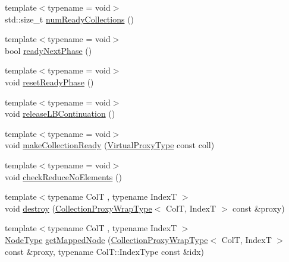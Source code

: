\begin{DoxyCompactItemize}
\item 
{\footnotesize template$<$typename  = void$>$ }\\std\+::size\+\_\+t \hyperlink{structvt_1_1vrt_1_1collection_1_1_collection_manager_a3fdd38adcd76281ada50f867e82817c6}{num\+Ready\+Collections} ()
\item 
{\footnotesize template$<$typename  = void$>$ }\\bool \hyperlink{structvt_1_1vrt_1_1collection_1_1_collection_manager_ae47451b1fb1fd640929995d964e052a6}{ready\+Next\+Phase} ()
\item 
{\footnotesize template$<$typename  = void$>$ }\\void \hyperlink{structvt_1_1vrt_1_1collection_1_1_collection_manager_af93d07828954a649201ef3fe463bf530}{reset\+Ready\+Phase} ()
\item 
{\footnotesize template$<$typename  = void$>$ }\\void \hyperlink{structvt_1_1vrt_1_1collection_1_1_collection_manager_a98b0c3c96cea99ac8d4310c1140f8880}{release\+L\+B\+Continuation} ()
\item 
{\footnotesize template$<$typename  = void$>$ }\\void \hyperlink{structvt_1_1vrt_1_1collection_1_1_collection_manager_adb1aa79d2e81bb571279f4b57ece0e8f}{make\+Collection\+Ready} (\hyperlink{namespacevt_a1b417dd5d684f045bb58a0ede70045ac}{Virtual\+Proxy\+Type} const coll)
\item 
{\footnotesize template$<$typename  = void$>$ }\\void \hyperlink{structvt_1_1vrt_1_1collection_1_1_collection_manager_a62ff67b1dc813664812a20e430a3f09b}{check\+Reduce\+No\+Elements} ()
\item 
{\footnotesize template$<$typename ColT , typename IndexT $>$ }\\void \hyperlink{structvt_1_1vrt_1_1collection_1_1_collection_manager_ae6e458293d04d8b29697fa0584c84c67}{destroy} (\hyperlink{structvt_1_1vrt_1_1collection_1_1_collection_manager_a56458ed7f9bb22b631b9b3a745f42f94}{Collection\+Proxy\+Wrap\+Type}$<$ ColT, IndexT $>$ const \&proxy)
\item 
{\footnotesize template$<$typename ColT , typename IndexT $>$ }\\\hyperlink{namespacevt_a866da9d0efc19c0a1ce79e9e492f47e2}{Node\+Type} \hyperlink{structvt_1_1vrt_1_1collection_1_1_collection_manager_ae333912da83d9beac8b710ec98e53094}{get\+Mapped\+Node} (\hyperlink{structvt_1_1vrt_1_1collection_1_1_collection_manager_a56458ed7f9bb22b631b9b3a745f42f94}{Collection\+Proxy\+Wrap\+Type}$<$ ColT, IndexT $>$ const \&proxy, typename Col\+T\+::\+Index\+Type const \&idx)

\end{DoxyCompactItemize}
